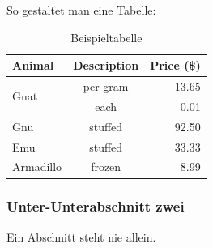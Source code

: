 \newpage

So gestaltet man eine Tabelle: 
\begin{table}[H]
	\caption{Beispieltabelle}
	\centering
	\begin{tabular}{lcr}
		\toprule
		\textbf{Animal} 		& \textbf{Description}	& \textbf{Price} (\$)\\
		\midrule
		\midrule
		\multirow{2}{*}{Gnat}	& per gram    			& 13.65\\
								& each        			& 0.01\\
		\midrule
		Gnu      				& stuffed     			& 92.50\\
		Emu       				& stuffed     			& 33.33\\
		Armadillo 				& frozen      			& 8.99\\
		\bottomrule
	\end{tabular}
\end{table}

\subsubsection{Unter-Unterabschnitt zwei}

Ein Abschnitt steht nie allein.